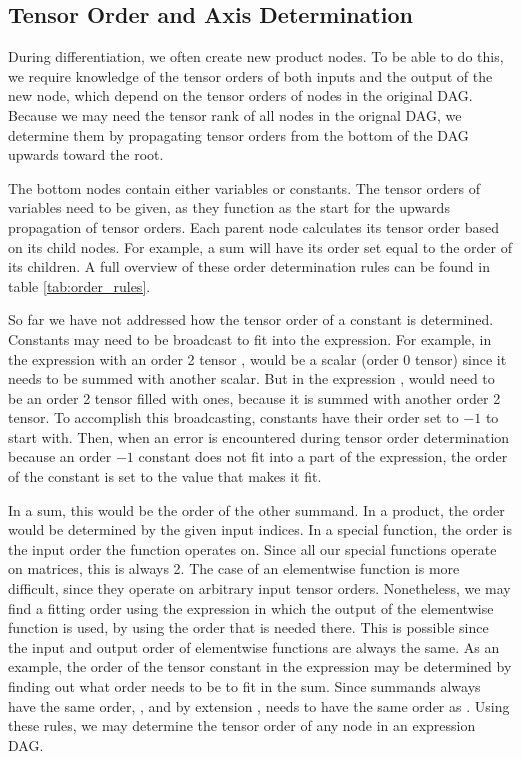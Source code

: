 \documentclass[12pt, a4paper]{report}
\begin{document}
\subsection{Tensor Order and Axis Determination}
During differentiation, we often create new product nodes.
To be able to do this, we require knowledge of the tensor orders of both inputs and the output of the new node, which depend on the tensor orders of nodes in the original DAG.
Because we may need the tensor rank of all nodes in the orignal DAG, we determine them by propagating tensor orders from the bottom of the DAG upwards toward the root.

The bottom nodes contain either variables or constants.
The tensor orders of variables need to be given, as they function as the start for the upwards propagation of tensor orders.
Each parent node calculates its tensor order based on its child nodes.
For example, a sum will have its order set equal to the order of its children.
A full overview of these order determination rules can be found in table \ref{tab:order_rules}.

So far we have not addressed how the tensor order of a constant is determined.
Constants may need to be broadcast to fit into the expression.
For example, in the expression  with an order 2 tensor ,  would be a scalar (order 0 tensor) since it needs to be summed with another scalar.
But in the expression ,  would need to be an order 2 tensor filled with ones, because it is summed with another order 2 tensor.
To accomplish this broadcasting, constants have their order set to $-1$ to start with.
Then, when an error is encountered during tensor order determination because an order $-1$ constant does not fit into a part of the expression, the order of the constant is set to the value that makes it fit.

In a sum, this would be the order of the other summand.
In a product, the order would be determined by the given input indices.
In a special function, the order is the input order the function operates on. Since all our special functions operate on matrices, this is always 2.
The case of an elementwise function is more difficult, since they operate on arbitrary input tensor orders.
Nonetheless, we may find a fitting order using the expression in which the output of the elementwise function is used, by using the order that is needed there.
This is possible since the input and output order of elementwise functions are always the same.
As an example, the order of the tensor constant  in the expression  may be determined by finding out what order  needs to be to fit in the sum.
Since summands always have the same order, , and by extension , needs to have the same order as .
Using these rules, we may determine the tensor order of any node in an expression DAG.
\end{document}
